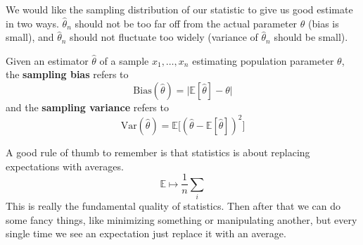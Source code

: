 \documentclass{article}
\begin{document}
    We would like the sampling distribution of our statistic to give us good estimate in two ways. $\widehat{\theta}_n$ should not be too far off from the actual parameter $\theta$ (bias is small), and $\widehat{\theta}_n$ should not fluctuate too widely (variance of $\widehat{\theta}_n$ should be small). 

    \begin{definition}
      Given an estimator $\widehat{\theta}$ of a sample $x_1, \ldots, x_n$ estimating population parameter $\theta$, the \textbf{sampling bias} refers to 
      \begin{equation}
        \mathrm{Bias}(\widehat{\theta}) = \big| \mathbb{E}[\widehat{\theta}] - \theta \big|
      \end{equation}
      and the \textbf{sampling variance} refers to 
      \begin{equation}
        \mathrm{Var}(\widehat{\theta}) = \mathbb{E} \big[ (\widehat{\theta} - \mathbb{E}[\widehat{\theta}])^2 \big]
      \end{equation}
    \end{definition}

    A good rule of thumb to remember is that statistics is about replacing expectations with averages. 
    \begin{equation}
      \mathbb{E} \mapsto \frac{1}{n} \sum_i
    \end{equation}
    This is really the fundamental quality of statistics. Then after that we can do some fancy things, like minimizing something or manipulating another, but every single time we see an expectation just replace it with an average. 
\end{document}
